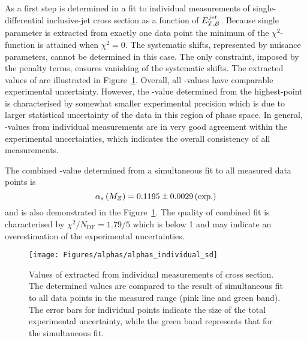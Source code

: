 As a first step \asz is determined in a fit to individual measurements of single-differential inclusive-jet cross section as a function of $\mbox{$E_{T,B}^{jet}$}$. Because single parameter is extracted from exactly one data point the minimum of the $\chi^2$-function is attained when $\chi^2=0$. The systematic shifts, represented by nuisance parameters, cannot be determined in this case. The only constraint, imposed by the penalty terms, ensures vanishing of the systematic shifts. The extracted values of \asz are illustrated in Figure~\ref{fig:alphassinglediffindividual}. Overall, all \as-values have comparable experimental uncertainty. However, the \as-value determined from the highest-\etjetb point is characterised by somewhat smaller experimental precision which is due to larger statistical uncertainty of the data in this region of phase space. In general, \as-values from individual measurements are in very good agreement within the experimental uncertainties, which indicates the overall consistency of all measurements.

The combined \asz-value determined from a simultaneous fit to all measured data points is
\begin{equation}
 \asz = 0.1195 \pm 0.0029 \left( \text{exp.} \right) %
 \label{eq:assingledifval}
\end{equation}
and is also demonstrated in the Figure~\ref{fig:alphassinglediffindividual}. The quality of combined fit is characterised by $\chi^2/N_\text{DF}=1.79/5$ which is below 1 and may indicate an overestimation of the experimental uncertainties.

\begin{figure}[t]
 \centering
 \texttt{[image: Figures/alphas/alphas\_individual\_sd]}
 \caption{Values of \asz extracted from individual measurements of \dsdetjetb cross section. The determined values are compared to the result of simultaneous fit to all data points in the measured \etjetb range (pink line and green band). The error bars for individual points indicate the size of the total experimental uncertainty, while the green band represents that for the simultaneous fit.}
 \label{fig:alphassinglediffindividual}
\end{figure}

